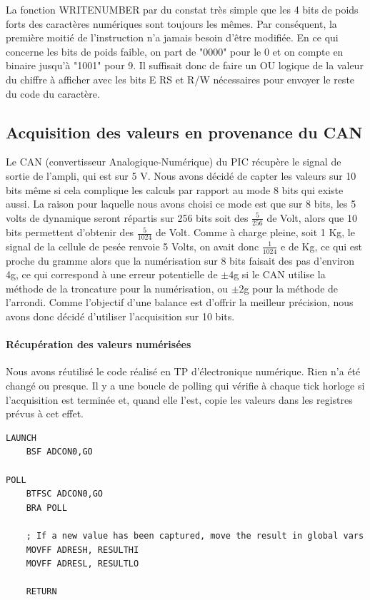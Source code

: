 \documentclass[a4paper,11pt,titlepage]{article}
\begin{document}
La fonction WRITENUMBER par du constat très simple que les 4 bits de poids forts des caractères numériques sont toujours les mêmes. Par conséquent, la première moitié de l'instruction n'a jamais besoin d'être modifiée. En ce qui concerne les bits de poids faible, on part de "0000" pour le 0 et on compte en binaire jusqu'à "1001" pour 9. Il suffisait donc de faire un OU logique de la valeur du chiffre à afficher avec les bits E RS et R/W nécessaires pour envoyer le reste du code du caractère.

\subsection{Acquisition des valeurs en provenance du CAN}

Le CAN (convertisseur Analogique-Numérique) du PIC récupère le signal de sortie de l'ampli, qui est sur 5 V. Nous avons décidé de capter les valeurs sur 10 bits même si cela complique les calculs par rapport au mode 8 bits qui existe aussi. La raison pour laquelle nous avons choisi ce mode est que sur 8 bits, les 5 volts de dynamique seront répartis sur 256 bits soit des $\frac{5}{256}$ de Volt, alors que 10 bits permettent d'obtenir des $\frac{5}{1024}$ de Volt. Comme à charge pleine, soit 1 Kg, le signal de la cellule de pesée renvoie 5 Volts, on avait donc $\frac{1}{1024}$ e de Kg, ce qui est proche du gramme alors que la numérisation sur 8 bits faisait des pas d'environ 4g, ce qui correspond à une erreur potentielle de $\pm 4$g si le CAN utilise la méthode de la troncature pour la numérisation, ou $\pm 2$g pour la méthode de l'arrondi. Comme l'objectif d'une balance est d'offrir la meilleur précision, nous avons donc décidé d'utiliser l'acquisition sur 10 bits.

\paragraph{Récupération des valeurs numérisées}
Nous avons réutilisé le code réalisé en TP d'électronique numérique. Rien n'a été changé ou presque. 
Il y a une boucle de polling qui vérifie à chaque tick horloge si l'acquisition est terminée et, quand elle l'est, copie les valeurs dans les registres prévus à cet effet. \\
\begin{lstlisting}
LAUNCH
    BSF ADCON0,GO
    
POLL
    BTFSC ADCON0,GO
    BRA POLL
    
    ; If a new value has been captured, move the result in global vars
    MOVFF ADRESH, RESULTHI
    MOVFF ADRESL, RESULTLO
    
    RETURN 
\end{lstlisting}
\end{document}
